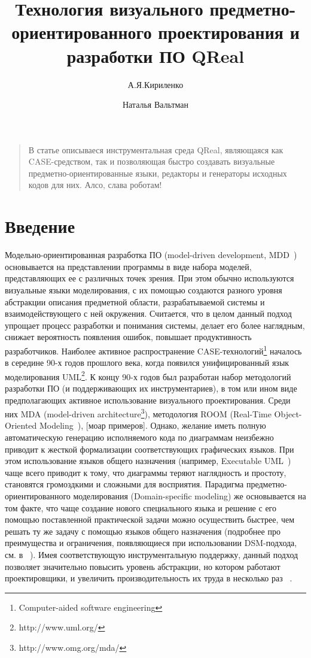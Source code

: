\documentclass[a4paper]{article}
\title{Технология визуального предметно-ориентированного проектирования и разработки ПО QReal}
\author{А.Я.Кириленко \and Наталья Вальтман}
\date{}
\begin{document}
\maketitle
\thispagestyle{empty}

\begin{quote}
\small\noindent
В статье описываеся инструментальная среда QReal, являющаяся как CASE-средством, так и позволяющая быстро создавать визуальные предметно-ориентированные языки, редакторы и генераторы исходных кодов для них. Алсо, слава роботам!
\end{quote}

\section*{Введение}

Модельно-ориентированная разработка ПО (model-driven development, MDD~\cite{mdd}) основывается на представлении программы в виде набора моделей, представляющих ее с различных точек зрения. При этом обычно используются визуальные языки моделирования, с их помощью создаются разного уровня абстракции описания предметной области, разрабатываемой системы и взаимодействующего с ней окружения. Считается, что в целом данный подход упрощает процесс разработки и понимания системы, делает его более наглядным, снижает вероятность появления ошибок, повышает продуктивность разработчиков. Наиболее активное распространение CASE-технологий\footnote{Computer-aided software engineering}  началось в середине 90-х годов прошлого века, когда появился унифицированный язык моделирования UML\footnote{http://www.uml.org/}. К концу 90-х годов был разработан набор методологий разработки ПО (и поддерживающих их инструментариев), в том или ином виде предполагающих активное использование визуального проектирования. Среди них MDA (model-driven architecture\footnote{http://www.omg.org/mda/}), методология ROOM (Real-Time Object-Oriented Modeling~\cite{room}), [моар примеров]. Однако, желание иметь полную автоматическую генерацию исполняемого кода по диаграммам неизбежно приводит к жесткой формализации соответствующих графических языков. При этом использование языков общего назначения (например, Executable UML~\cite{xuml}) чаще всего приводит к тому, что диаграммы теряют наглядность и простоту, становятся громоздкими и сложными для восприятия. Парадигма предметно-ориентированного моделирования (Domain-specific modeling) же основывается на том факте, что чаще создание нового специального языка и решение с его помощью поставленной практической задачи можно осуществить быстрее, чем решать ту же задачу с помощью языков общего назначения (подробнее про преимущества и ограничения, появляющиеся при использовании DSM-подхода, см. в ~\cite{theBook}). Имея соответствующую инструментальную поддержку, данный подход позволяет значительно повысить уровень абстракции, но котором работают проектировщики, и увеличить производительность их труда в несколько раз ~\cite{dsm01, dsm02, dsm03}.
\end{document}
